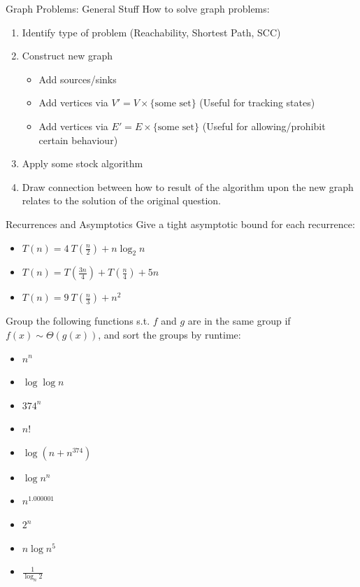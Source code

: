 \documentclass{beamer}
\begin{document}
\begin{frame}[t]{Graph Problems: General Stuff}
  \alert{How to solve graph problems:}
  \begin{enumerate}
        \item Identify type of problem (Reachability, Shortest Path, SCC)
        \item Construct new graph
        \begin{itemize}
            \item Add sources/sinks
            \item Add vertices via $V' = V \times \{\text{some set}\}$ (Useful for tracking states)
            \item Add vertices via $E' = E \times \{\text{some set}\}$ (Useful for allowing/prohibit certain behaviour)
        \end{itemize}
        \item Apply some stock algorithm
        \item Draw connection between how to result of the algorithm upon the new graph relates to the solution of the original question.
  \end{enumerate}
\end{frame}

\begin{frame}[t]{Recurrences and Asymptotics}
    Give a tight asymptotic bound for each recurrence:
    \begin{itemize}
        \item $T(n) = 4\>T(\frac{n}{2}) + n \log_2 n$
        \item \pause $T(n) = T(\frac{3n}{4}) + T(\frac{n}{4}) + 5n$
        \item \pause $T(n) = 9\> T(\frac{n}{3}) + n^2$
    \end{itemize}    
    \pause Group the following functions s.t. $f$ and $g$ are in the same group if $f(x) \sim \Theta(g(x))$, and sort the groups by runtime:
    \begin{itemize}
        \item $n^n$
        \item $\log \log n$ 
        \item $374^n$
        \item $n!$
        \item $\log (n + n^{374})$ 
        \item $\log n^n$
        \item $n^{1.000001}$
        \item $2^n$
        \item $n \log n^5$
        \item $\frac{1}{\log_n 2}$
    \end{itemize}
    
\end{frame}
\end{document}
